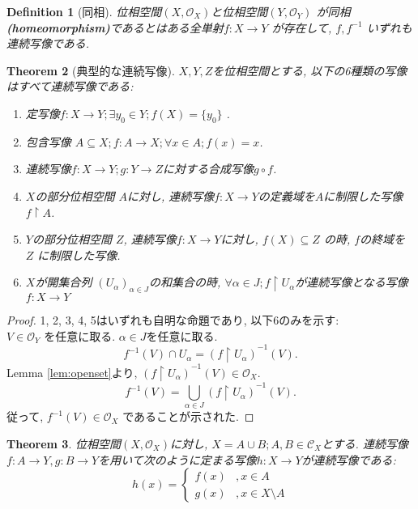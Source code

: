 \documentclass[lualatex]{ltjsbook}
\newtheorem{theorem}{Theorem}[chapter]
\newtheorem{definition}[theorem]{Definition}
\theoremstyle{remark}
\theoremstyle{plain}
\begin{document}
\begin{definition}[同相]
	位相空間$\left( X, \mathcal{O}_X \right) $と位相空間$\left( Y, \mathcal{O}_Y \right) $ が同相\textbf{(homeomorphism)}であるとはある全単射$f:X\to Y$ が存在して, $f, f^{-1}$ いずれも連続写像である.  
\end{definition}










\begin{theorem}[典型的な連続写像]
	$X, Y, Z$を位相空間とする,  以下の6種類の写像はすべて連続写像である:
	 \begin{enumerate}
		\item 定写像$f: X \to Y; \exists y_0 \in Y ; f(X) =\{y_0\} $ .
		\item 包含写像 $A\subseteq X ; f: A \to X; \forall x \in A; f(x)=x$.
		\item 連続写像$f:X\to Y; g:Y\to Z$に対する合成写像$g\circ f$.
		\item $X$の部分位相空間 $A$に対し, 連続写像$f:X\to Y$の定義域を$A$に制限した写像 $f\upharpoonright A$.
		\item  $Y$の部分位相空間 $Z$,  連続写像$f:X \to Y$に対し,  $f\left( X \right) \subseteq Z$ の時,  $f$の終域を $Z$ に制限した写像.
		\item $X$が開集合列 $\left(U_{\alpha}\right) _{\alpha \in J}$の和集合の時,  
      $\forall \alpha \in J; f\upharpoonright U_{\alpha}$が連続写像となる写像 $f:X \to Y$
	\end{enumerate}
\end{theorem}

\begin{proof}
	1, 2, 3, 4, 5はいずれも自明な命題であり,  以下6のみを示す:\\
	$V \in \mathcal{O}_Y$ を任意に取る. $\alpha \in J$を任意に取る.
	\[
	f^{-1}(V)\cap U_{\alpha} = (f\upharpoonright U_{\alpha})^{-1}(V)
	.\] 
	Lemma \ref{lem:openset}より,  $ (f\upharpoonright U_{\alpha})^{-1}(V) \in \mathcal{O}_X$.
	\[
	f^{-1}(V)=\bigcup_{\alpha \in J}  (f\upharpoonright U_{\alpha})^{-1}(V)
	.\]
	従って,  $f^{-1}(V) \in \mathcal{O}_X$ であることが示された.
\end{proof}

\begin{theorem}
\label{thm:paste}
	位相空間$(X, \mathcal{O}_X)$に対し, $X=A \cup B; A, B \in \mathcal{C}_X$とする. 連続写像$f:A\to Y, g:B\to Y$を用いて次のように定まる写像$h :X\to Y $が連続写像である:
	\[
	h\left( x\right) =
	\begin{cases}
		f(x) &, x \in A\\
		g(x) &, x \in X\setminus A
	\end{cases}
	\] 
\end{theorem}
\end{document}
